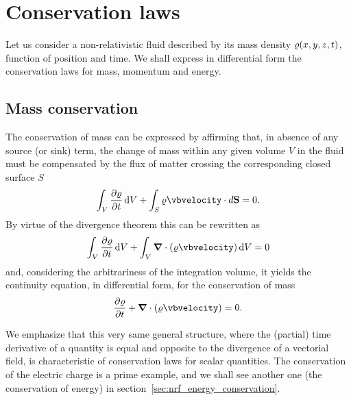 \section{Conservation laws}

Let us consider a non-relativistic fluid described by its mass density
$\varrho(x, y, z, t)$, function of position and time. We shall express in differential
form the conservation laws for mass, momentum and energy.



\subsection{Mass conservation}\label{sec:nrf_mass_conservation}

The conservation of mass can be expressed by affirming that, in absence of any
source (or sink) term, the change of mass within any given volume $V$ in the fluid
must be compensated by the flux of matter crossing the corresponding closed surface $S$
\begin{align*}
  \int_V \pdv{\density}{t} \dd{V} + \int_S \density \vbvelocity \cdot d\vb{S} = 0.
\end{align*}
By virtue of the divergence theorem this can be rewritten as
\begin{align*}
  \int_V \pdv{\density}{t} \dd{V} + \int_V \vnabla \cdot (\density \vbvelocity) \dd{V} = 0
\end{align*}
and, considering the arbitrariness of the integration volume, it yields the continuity
equation, in differential form, for the conservation of mass
\begin{align}\label{eq:continuity_equation}
  \pdv{\density}{t} + \vnabla \cdot (\density \vbvelocity) = 0.
\end{align}

We emphasize that this very same general structure, where the (partial) time derivative
of a quantity is equal and opposite to the divergence of a vectorial field, is
characteristic of conservation laws for scalar quantities. The conservation of the
electric charge
is a prime example, and we shall see another one (the conservation of energy) in section~\ref{sec:nrf_energy_conservation}.



